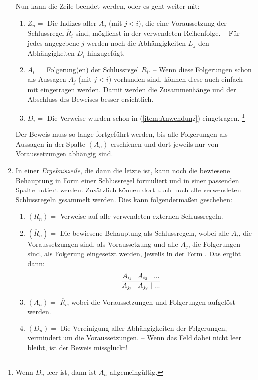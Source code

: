 \begin{enumerate}
	Nun kann die Zeile beendet werden, oder es geht weiter mit:
	\begin{enumerate}
		\setcounter{enumii}{\value{Enumii}}%
		\item \label{item:Anwendung} $Z_n =$ Die Indizes aller $A_j$ (mit $j < i$), die eine Voraussetzung der Schlussregel $\overline{R}_i$ sind, möglichst in der verwendeten Reihenfolge.
		-- Für jedes angegebene $j$ werden noch die Abhängigkeiten $D_j$ den Abhängigkeiten $D_i$ hinzugefügt.
		\item $A_i =$ Folgerung(en) der Schlussregel $\overline{R}_i$.
		-- Wenn diese Folgerungen schon als Aussagen $A_j$ (mit $j < i$) vorhanden sind, können diese auch einfach mit  eingetragen werden.
		Damit werden die Zusammenhänge und der Abschluss des Beweises besser ersichtlich.
		\item $D_i =$ Die Verweise wurden schon in (\ref{item:Anwendung}) eingetragen.%
		\footnote{Wenn $D_n$ leer ist, dann ist $A_n$ allgemeingültig.}
	\end{enumerate}
	Der Beweis muss so lange fortgeführt werden, bis alle Folgerungen als Aussagen in der Spalte $(A_n)$ erschienen und dort jeweils nur von Voraussetzungen abhängig sind.
	\item \label{item:Ergebniszeile} In einer \emph{Ergebniszeile}, die dann die letzte ist, kann noch die bewiesene Behauptung in Form einer Schlussregel formuliert und in einer passenden Spalte notiert werden.
	Zusätzlich können dort auch noch alle verwendeten Schlussregeln gesammelt werden.
	Dies kann \textzB folgendermaßen geschehen:
	\begin{enumerate}
		\item $(R_n) =$ Verweise auf alle verwendeten externen Schlussregeln.
		\item $(\overline{R}_n) =$ Die bewiesene Behauptung als Schlussregeln, wobei alle $A_i$, die Voraussetzungen sind, als Voraussetzung und alle $A_j$, die Folgerungen sind, als Folgerung eingesetzt werden, jeweils in der Form  \textbzw {}.
		Das ergibt dann:
		\[ \frac{A_{i_1} \mid A_{i_2} \mid ...}{A_{j_1} \mid A_{j_2} \mid ...} \]
		\item $(A_n) =$ $\overline{R}_i$, wobei die Voraussetzungen und Folgerungen aufgelöst werden.
		\item $(D_n) =$ Die Vereinigung aller Abhängigkeiten der Folgerungen, vermindert um die Voraussetzungen.
		-- Wenn das Feld dabei nicht leer bleibt, ist der Beweis missglückt!
	\end{enumerate}
\end{enumerate}

